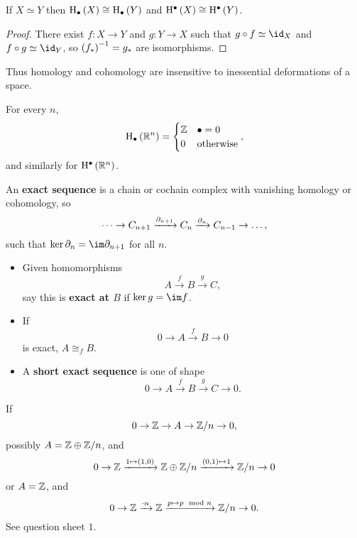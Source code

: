 \begin{corollary}
If $ X \simeq Y $ then $ \H_\bullet\br{X} \cong \H_\bullet\br{Y} $ and $ \H^\bullet\br{X} \cong \H^\bullet\br{Y} $.
\end{corollary}

\begin{proof}
There exist $ f : X \to Y $ and $ g : Y \to X $ such that $ g \circ f \simeq \id_X $ and $ f \circ g \simeq \id_Y $, so $ \br{f_*}^{-1} = g_* $ are isomorphisms.
\end{proof}

Thus homology and cohomology are insensitive to inessential deformations of a space.

\begin{corollary}
For every $ n $,
$$ \H_\bullet\br{\RR^n} =
\begin{cases}
\ZZ & \bullet = 0 \\
0 & \text{otherwise}
\end{cases},
$$
and similarly for $ \H^\bullet\br{\RR^n} $.
\end{corollary}

\begin{definition*}
An \textbf{exact sequence} is a chain or cochain complex with vanishing homology or cohomology, so
$$ \dots \to C_{n + 1} \xrightarrow{\partial_{n + 1}} C_n \xrightarrow{\partial_n} C_{n - 1} \to \dots, $$
such that $ \ker \da_n = \im \da_{n + 1} $ for all $ n $.
\begin{itemize}
\item Given homomorphisms
$$ A \xrightarrow{f} B \xrightarrow{g} C, $$
say this is \textbf{exact at $ B $} if $ \ker g = \im f $.
\item If
$$ 0 \to A \xrightarrow{f} B \to 0 $$
is exact, $ A \cong_f B $.
\item A \textbf{short exact sequence} is one of shape
$$ 0 \to A \xrightarrow{f} B \xrightarrow{g} C \to 0. $$
\end{itemize}
\end{definition*}

\begin{example*}
If
$$ 0 \to \mathbb{Z} \to A \to \mathbb{Z} / n \to 0, $$
possibly $ A = \mathbb{Z} \oplus \mathbb{Z} / n $, and
$$ 0 \to \ZZ \xrightarrow{1 \mapsto \br{1, 0}} \ZZ \oplus \ZZ / n \xrightarrow{\br{0, 1} \mapsto 1} \ZZ / n \to 0 $$
or $ A = \mathbb{Z} $, and
$$ 0 \to \mathbb{Z} \xrightarrow{\cdot n} \mathbb{Z} \xrightarrow{p \mapsto p \mod n} \mathbb{Z} / n \to 0. $$
See question sheet $ 1 $.
\end{example*}

\pagebreak

